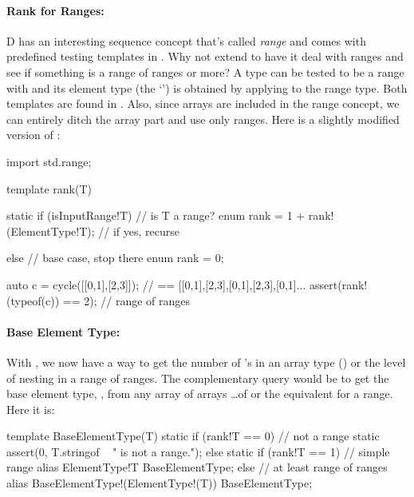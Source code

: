\paragraph{Rank for Ranges:}\label{rankforranges}

D has an interesting sequence concept that's called \emph{range} and comes with predefined testing templates in . Why not extend  to have it deal with ranges and see if something is a range of ranges or more? A type can be tested to be a range with  and its element type (the `') is obtained by applying  to the range type. Both templates are found in . Also, since arrays are included in the range concept, we can entirely ditch the array part and use only ranges. Here is a slightly modified version of :

\begin{dcode}
import std.range;

template rank(T)
{
    static if (isInputRange!T)                // is T a range?
        enum rank = 1 + rank!(ElementType!T); // if yes, recurse

    else                                      // base case, stop there
        enum rank = 0; 
}

auto c = cycle([[0,1],[2,3]]); // == [[0,1],[2,3],[0,1],[2,3],[0,1]...
assert(rank!(typeof(c)) == 2); // range of ranges 
\end{dcode}

\paragraph{Base Element Type:}

With , we now have a way to get the number of \DD{[]}'s in an array type () or the level of nesting in a range of ranges. The complementary query would be to get the base element type, , from any array of arrays \ldots of  or the equivalent for a range. Here it is:

\begin{dcode}
template BaseElementType(T)
{
    static if (rank!T == 0)      // not a range
        static assert(0, T.stringof ~ " is not a range.");
    else static if (rank!T == 1) // simple range
        alias ElementType!T                     BaseElementType;
    else                         // at least range of ranges
        alias BaseElementType!(ElementType!(T)) BaseElementType;
}        
\end{dcode}


